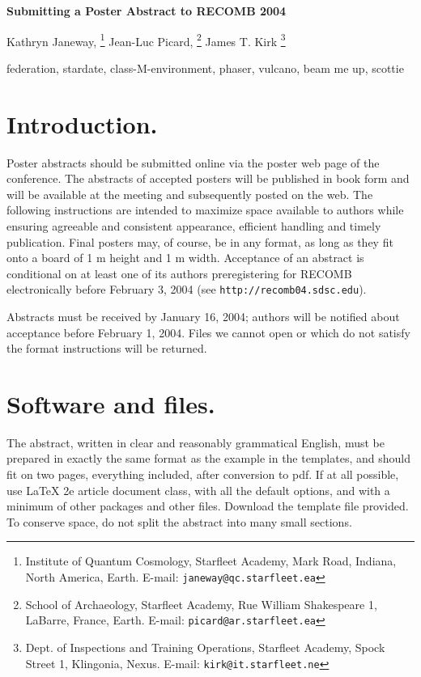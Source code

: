 \documentclass[twoside]{article}
\begin{document}
\thispagestyle{headings}
\begin{center}
\Large \bf Submitting  a Poster Abstract to RECOMB 2004\\

\vspace{.5cm}\normalsize 

Kathryn Janeway,
\footnote{Institute of Quantum Cosmology, Starfleet Academy, Mark Road, Indiana, 
North America, Earth. E-mail: {\tt janeway@qc.starfleet.ea}} 
Jean-Luc Picard,
\footnote{School of Archaeology, Starfleet Academy, Rue William Shakespeare 1, 
LaBarre, France, Earth. E-mail:  {\tt picard@ar.starfleet.ea}}
James T. Kirk
\footnote{Dept. of Inspections and Training Operations, Starfleet Academy,  
Spock Street 1, Klingonia, Nexus. E-mail:
{\tt kirk@it.starfleet.ne}} 
\end{center}

\small

\vspace{.3cm}

 federation, stardate, class-M-environment, phaser, vulcano,
 beam me up, scottie

\section{\large Introduction.} Poster abstracts should be submitted 
online via the poster web page of the conference. The abstracts of accepted posters will be published in book
form and will be available at the meeting and subsequently posted on the web. 
The following instructions are
intended to maximize space available to authors while ensuring agreeable and
consistent appearance, efficient handling and timely publication. Final posters
may, of course, be in any format, as long as they fit onto a board of 1 m 
height and 1 m width. Acceptance of an abstract is conditional on at 
least 
one of its authors preregistering for RECOMB electronically before February 3, 2004 (see
{\tt http://recomb04.sdsc.edu}).

Abstracts must be received by January 16, 2004; authors will be notified about
acceptance before February 1, 2004. Files we cannot open or
which do not satisfy the format instructions will be returned. 

\section{\large Software and files.}The abstract, written in clear and
reasonably grammatical English, must be prepared in exactly the same format as
the example in the templates, and should fit on two pages, everything included, 
after conversion to pdf. 
If at all possible, use LaTeX 2e article document class, with all the default
options, and with a minimum of other packages and other files.  Download the
template file provided. To conserve space, do not split the abstract into many
small sections. 
\end{document}
